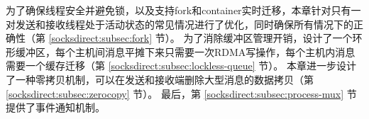 为了确保线程安全并避免锁，以及支持fork和container实时迁移，本章针对只有一对发送和接收线程处于活动状态的常见情况进行了优化，同时确保所有情况下的正确性（第 \ref {socksdirect:subsec:fork} 节）。
为了消除缓冲区管理开销，设计了一个环形缓冲区，每个主机间消息平摊下来只需要一次RDMA写操作，每个主机内消息需要一个缓存迁移（第 \ref {socksdirect:subsec:lockless-queue}  节）。
本章进一步设计了一种零拷贝机制，可以在发送和接收端删除大型消息的数据拷贝（第 \ref {socksdirect:subsec:zerocopy} 节）。
最后，第 \ref {socksdirect:subsec:process-mux} 节提供了事件通知机制。



